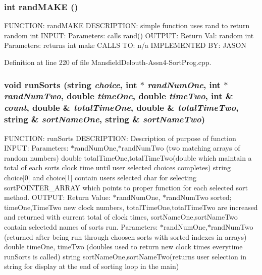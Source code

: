 \hypertarget{_mansfield_delouth-_assn4-_sort_prog_8cpp_a191743d28b671610e8d78df14b41ed9e}{
\subsubsection[{randMAKE}]{\setlength{\rightskip}{0pt plus 5cm}int randMAKE ()}}
\label{_mansfield_delouth-_assn4-_sort_prog_8cpp_a191743d28b671610e8d78df14b41ed9e}
FUNCTION: randMAKE DESCRIPTION: simple function uses rand to return random int INPUT: Parameters: calls rand() OUTPUT: Return Val: random int Parameters: returns int make CALLS TO: n/a IMPLEMENTED BY: JASON 

Definition at line 220 of file MansfieldDelouth-\/Assn4-\/SortProg.cpp.

\hypertarget{_mansfield_delouth-_assn4-_sort_prog_8cpp_acd0f7b42076b153145b2198ffad4a0c2}{
\subsubsection[{runSorts}]{\setlength{\rightskip}{0pt plus 5cm}void runSorts (string {\em choice}, \/  int $\ast$ {\em randNumOne}, \/  int $\ast$ {\em randNumTwo}, \/  double {\em timeOne}, \/  double {\em timeTwo}, \/  int \& {\em count}, \/  double \& {\em totalTimeOne}, \/  double \& {\em totalTimeTwo}, \/  string \& {\em sortNameOne}, \/  string \& {\em sortNameTwo})}}
\label{_mansfield_delouth-_assn4-_sort_prog_8cpp_acd0f7b42076b153145b2198ffad4a0c2}
FUNCTION: runSorts DESCRIPTION: Description of purpose of function INPUT: Parameters: $\ast$randNumOne,$\ast$randNumTwo (two matching arrays of random numbers) double totalTimeOne,totalTimeTwo(double which maintain a total of each sorts clock time until user selected choices completes) string choice\mbox{[}0\mbox{]} and choice\mbox{[}1\mbox{]} contain users selected char for selecting sortPOINTER\_\-ARRAY which points to proper function for each selected sort method. OUTPUT: Return Value: $\ast$randNumOne, $\ast$randNumTwo sorted; timeOne,TimeTwo new clock numbers, totalTimeOne,totalTimeTwo are increased and returned with current total of clock times, sortNameOne,sortNameTwo contain selectedd names of sorts run. Parameters: $\ast$randNumOne,$\ast$randNumTwo (returned after being run through choosen sorts with sorted indexes in arrays) double timeOne, timeTwo (doubles used to return new clock times everytime runSorts is called) string sortNameOne,sortNameTwo(returns user selection in string for display at the end of sorting loop in the main)

